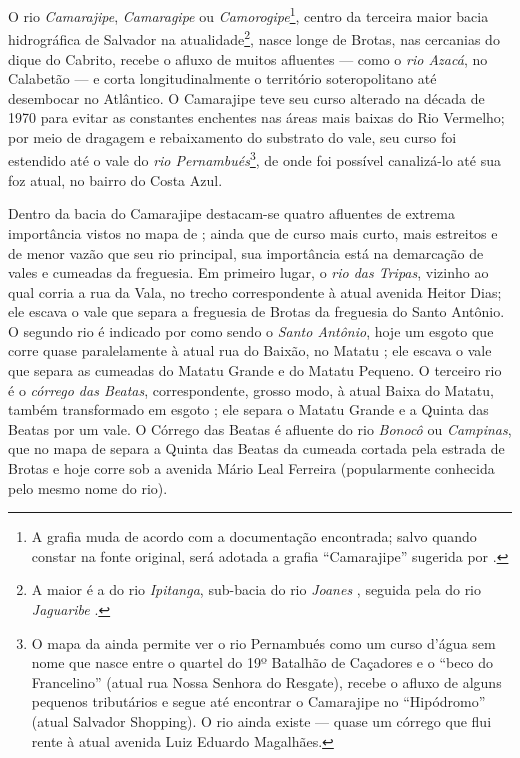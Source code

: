 O rio \textit{Camarajipe}, \textit{Camaragipe} ou \textit{Camorogipe}\footnote{A grafia muda de acordo com a documentação encontrada; salvo quando constar na fonte original, será adotada a grafia ``Camarajipe'' sugerida por .}, centro da terceira maior bacia hidrográfica de Salvador na atualidade\footnote{A maior é a do rio \textit{Ipitanga}, sub-bacia do rio \textit{Joanes} \cite[p.~311]{santos_aguas_2010}, seguida pela do rio \textit{Jaguaribe} \cite[p.~229]{santos_aguas_2010}.}, nasce longe de Brotas, nas cercanias do dique do Cabrito, recebe o afluxo de muitos afluentes --- como o \textit{rio Azacá}, no Calabetão --- e corta longitudinalmente o território soteropolitano até desembocar no Atlântico. O Camarajipe teve seu curso alterado na década de 1970 para evitar as constantes enchentes nas áreas mais baixas do Rio Vermelho; por meio de dragagem e rebaixamento do substrato do vale, seu curso foi estendido até o vale do \textit{rio Pernambués}\footnote{O mapa da  ainda permite ver o rio Pernambués como um curso d'água sem nome que nasce entre o quartel do 19º Batalhão de Caçadores e o ``beco do Francelino'' (atual rua Nossa Senhora do Resgate), recebe o afluxo de alguns pequenos tributários e segue até encontrar o Camarajipe no ``Hipódromo'' (atual Salvador Shopping). O rio ainda existe --- quase um córrego que flui rente à atual avenida Luiz Eduardo Magalhães.}, de onde foi possível canalizá-lo até sua foz atual, no bairro do Costa Azul.

Dentro da bacia do Camarajipe destacam-se quatro afluentes de extrema importância vistos no mapa de ; ainda que de curso mais curto, mais estreitos e de menor vazão que seu rio principal, sua importância está na demarcação de vales e cumeadas da freguesia. Em primeiro lugar, o \textit{rio das Tripas}, vizinho ao qual corria a rua da Vala, no trecho correspondente à atual avenida Heitor Dias; ele escava o vale que separa a freguesia de Brotas da freguesia do Santo Antônio. O segundo rio é indicado por  como sendo o \textit{Santo Antônio}, hoje um esgoto que corre quase paralelamente à atual rua do Baixão, no Matatu \cite[p.~136]{santos_aguas_2010}; ele escava o vale que separa as cumeadas do Matatu Grande e do Matatu Pequeno. O terceiro rio é o \textit{córrego das Beatas}, correspondente, grosso modo, à atual Baixa do Matatu, também transformado em esgoto \cite[p.~158]{santos_aguas_2010}; ele separa o Matatu Grande e a Quinta das Beatas por um vale. O Córrego das Beatas é afluente do rio \textit{Bonocô} ou \textit{Campinas}, que no mapa de  separa a Quinta das Beatas da cumeada cortada pela estrada de Brotas e hoje corre sob a avenida Mário Leal Ferreira (popularmente conhecida pelo mesmo nome do rio).

